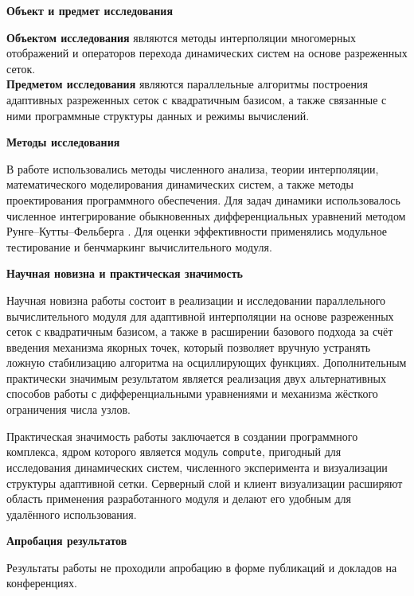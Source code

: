 \textbf{Объект и предмет исследования}

\textbf{Объектом исследования} являются методы интерполяции многомерных отображений и операторов перехода динамических систем на основе разреженных сеток. \\
\textbf{Предметом исследования} являются параллельные алгоритмы построения адаптивных разреженных сеток с квадратичным базисом, а также связанные с ними программные структуры данных и режимы вычислений.

\textbf{Методы исследования}

В работе использовались методы численного анализа, теории интерполяции, математического моделирования динамических систем, а также методы проектирования программного обеспечения. Для задач динамики использовалось численное интегрирование обыкновенных дифференциальных уравнений методом Рунге--Кутты--Фельберга \cite{Hairer1993}. Для оценки эффективности применялись модульное тестирование и бенчмаркинг вычислительного модуля.

\textbf{Научная новизна и практическая значимость}

Научная новизна работы состоит в реализации и исследовании параллельного вычислительного модуля для адаптивной интерполяции на основе разреженных сеток с квадратичным базисом, а также в расширении базового подхода за счёт введения механизма якорных точек, который позволяет вручную устранять ложную стабилизацию алгоритма на осциллирующих функциях. Дополнительным практически значимым результатом является реализация двух альтернативных способов работы с дифференциальными уравнениями и механизма жёсткого ограничения числа узлов.

Практическая значимость работы заключается в создании программного комплекса, ядром которого является модуль \texttt{compute}, пригодный для исследования динамических систем, численного эксперимента и визуализации структуры адаптивной сетки. Серверный слой и клиент визуализации расширяют область применения разработанного модуля и делают его удобным для удалённого использования.

\textbf{Апробация результатов}

Результаты работы не проходили апробацию в форме публикаций и докладов на конференциях.